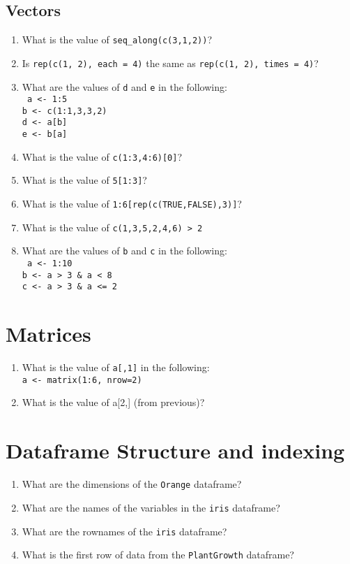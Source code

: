 \documentclass[12pt,a4paper]{article}
\begin{document}
\subsection*{Vectors}
\begin{enumerate}
\item What is the value of \texttt{seq\_along(c(3,1,2))}?
\item Is \texttt{rep(c(1, 2), each = 4)} the same as \texttt{rep(c(1, 2), times = 4)}?
\vspace{1em}
\item What are the values of \texttt{d} and \texttt{e} in the following:\\
\texttt{
a <- 1:5\\
b <- c(1:1,3,3,2)\\
d <- a[b]\\
e <- b[a]
}
\vspace{1em}
\item What is the value of \texttt{c(1:3,4:6)[0]}?
\item What is the value of \texttt{5[1:3]}?
\vspace{1em}
\item What is the value of \texttt{1:6[rep(c(TRUE,FALSE),3)]}?
\item What is the value of \texttt{c(1,3,5,2,4,6) > 2}
\item What are the values of \texttt{b} and \texttt{c} in the following:\\
\texttt{
a <- 1:10\\
b <- a > 3 \& a < 8\\
c <- a > 3 \& a <= 2
}
\end{enumerate}


\section*{Matrices}
\begin{enumerate}
\item What is the value of \texttt{a[,1]} in the following:\\
\texttt{a <- matrix(1:6, nrow=2)}
\item What is the value of {a[2,]} (from previous)?
\end{enumerate}


\section*{Dataframe Structure and indexing}
\begin{enumerate}
\item What are the dimensions of the \texttt{Orange} dataframe?
\item What are the names of the variables in the \texttt{iris} dataframe?
\item What are the rownames of the \texttt{iris} dataframe?
\item What is the first row of data from the \texttt{PlantGrowth} dataframe?
\end{enumerate}
\end{document}

